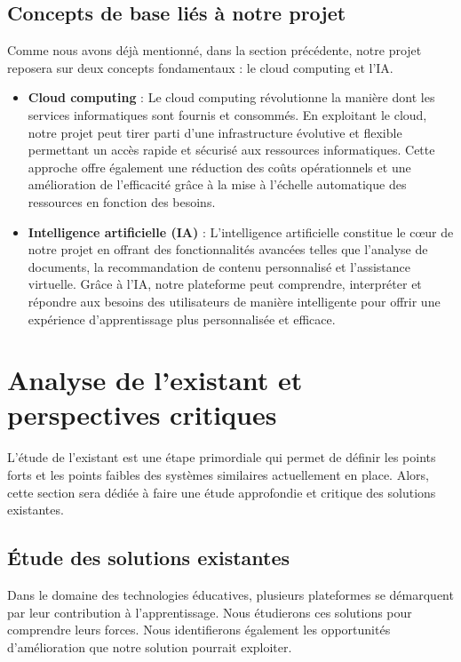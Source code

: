 \vspace{0.5em}

\subsection{Concepts de base liés à notre projet} 
Comme nous avons déjà mentionné, dans la section précédente, notre projet reposera sur deux concepts fondamentaux : le cloud computing et l’IA.

\begin{itemize}[itemsep=2pt, parsep=2pt]
    \item \textbf{Cloud computing} : Le cloud computing révolutionne la manière dont les services informatiques sont fournis et consommés. En exploitant le cloud, notre projet peut tirer parti d'une infrastructure évolutive et flexible permettant un accès rapide et sécurisé aux ressources informatiques. Cette approche offre également une réduction des coûts opérationnels et une amélioration de l'efficacité grâce à la mise à l'échelle automatique des ressources en fonction des besoins.
    \item \textbf{Intelligence artificielle (IA)} : L'intelligence artificielle constitue le cœur de notre projet en offrant des fonctionnalités avancées telles que l'analyse de documents, la recommandation de contenu personnalisé et l'assistance virtuelle. Grâce à l'IA, notre plateforme peut comprendre, interpréter et répondre aux besoins des utilisateurs de manière intelligente pour offrir une expérience d'apprentissage plus personnalisée et efficace.
\end{itemize}

\section{Analyse de l’existant et perspectives critiques}
L’étude de l’existant est une étape primordiale qui permet de définir les points forts et les points faibles des systèmes similaires actuellement en place. Alors, cette section sera dédiée à faire une étude approfondie et critique des solutions existantes.

\subsection{Étude des solutions existantes}
Dans le domaine des technologies éducatives, plusieurs plateformes se démarquent par leur contribution à l'apprentissage. Nous étudierons ces solutions pour comprendre leurs forces. Nous identifierons également les opportunités d'amélioration que notre solution pourrait exploiter.

